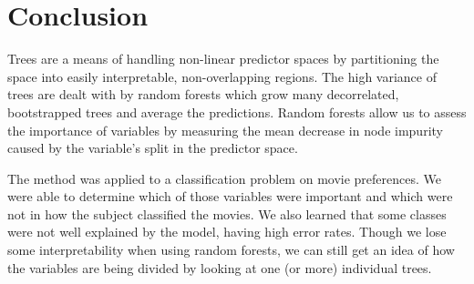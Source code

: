 \section{Conclusion}

Trees are a means of handling non-linear predictor spaces by partitioning the space into easily interpretable, non-overlapping regions. The high variance of trees are dealt with by random forests which grow many decorrelated, bootstrapped trees and average the predictions. Random forests allow us to assess the importance of variables by measuring the mean decrease in node impurity caused by the variable's split in the predictor space.

The method was applied to a classification problem on movie preferences. We were able to determine which of those variables were important and which were not in how the subject classified the movies. We also learned that some classes were not well explained by the model, having high error rates. Though we lose some interpretability when using random forests, we can still get an idea of how the variables are being divided by looking at one (or more) individual trees.

